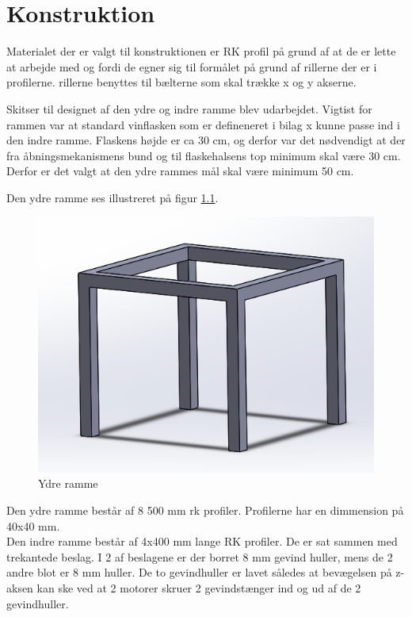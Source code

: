 \chapter{Konstruktion}

Materialet der er valgt til konstruktionen er RK profil på grund af at de er lette at arbejde med og fordi de egner sig til formålet på grund af rillerne der er i profilerne. rillerne benyttes til bælterne som skal trække x og y akserne. 

Skitser til designet af den ydre og indre ramme blev udarbejdet. Vigtist for rammen var at standard vinflasken som er defineneret i bilag x kunne passe ind i den indre ramme.
Flaskens højde er ca 30 cm, og derfor var det nødvendigt at der fra åbningsmekanismens bund og til flaskehalsens top minimum skal være 30 cm. Derfor er det valgt at den ydre rammes mål skal være minimum 50 cm.

Den ydre ramme ses illustreret på figur \ref{CT_CD}.

\begin{figure}[H]
	\centerline{\includegraphics[scale=1]{Konstruktion/Billeder/ydre_ramme}}
	\caption{Ydre ramme}
	\label{CT_CD}
\end{figure}

\noindent
Den ydre ramme består af 8 500 mm rk profiler. Profilerne har en dimmension på 40x40 mm.\\

Den indre ramme består af 4x400 mm lange RK profiler. De er sat sammen med trekantede beslag. I 2 af beslagene er der borret 8 mm gevind huller, mens de 2 andre blot er 8 mm huller. De to gevindhuller er lavet således at bevægelsen på z-aksen kan ske ved at 2 motorer skruer 2 gevindstænger ind og ud af de 2 gevindhuller.

